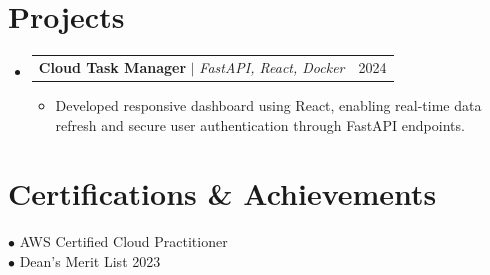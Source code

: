 \documentclass[letterpaper,10pt]{article}
\makeatletter
\newcommand{\resumeItem}[1]{
  \item\small{
    {#1 \vspace{-2pt}}
  }
}
\newcommand{\resumeProjectHeading}[2]{
    \item
    \begin{tabular*}{0.97\textwidth}{l@{\extracolsep{\fill}}r}
      \small#1 & #2 \\
    \end{tabular*}\vspace{-7pt}
}
\newcommand{\resumeSubHeadingListStart}{\begin{itemize}[leftmargin=0.15in, label={}]}
\newcommand{\resumeSubHeadingListEnd}{\end{itemize}}
\newcommand{\resumeItemListStart}{\begin{itemize}}
\newcommand{\resumeItemListEnd}{\end{itemize}\vspace{-5pt}}
\makeatother
\begin{document}
\section{Projects}
    \resumeSubHeadingListStart
              \resumeProjectHeading
          {\textbf{Cloud Task Manager} $|$ \emph{FastAPI, React, Docker}}{2024}
          \resumeItemListStart
                          \resumeItem{Developed responsive dashboard using React, enabling real-time data refresh and secure user authentication through FastAPI endpoints.}
                      \resumeItemListEnd
          \resumeSubHeadingListEnd

\section{Certifications \& Achievements}
  \begin{itemize}[leftmargin=0.15in, label={}]
    \small{\item{
              $\bullet$ AWS Certified Cloud Practitioner \\
                    $\bullet$ Dean's Merit List 2023 \\
          }}
  \end{itemize}
\end{document}
